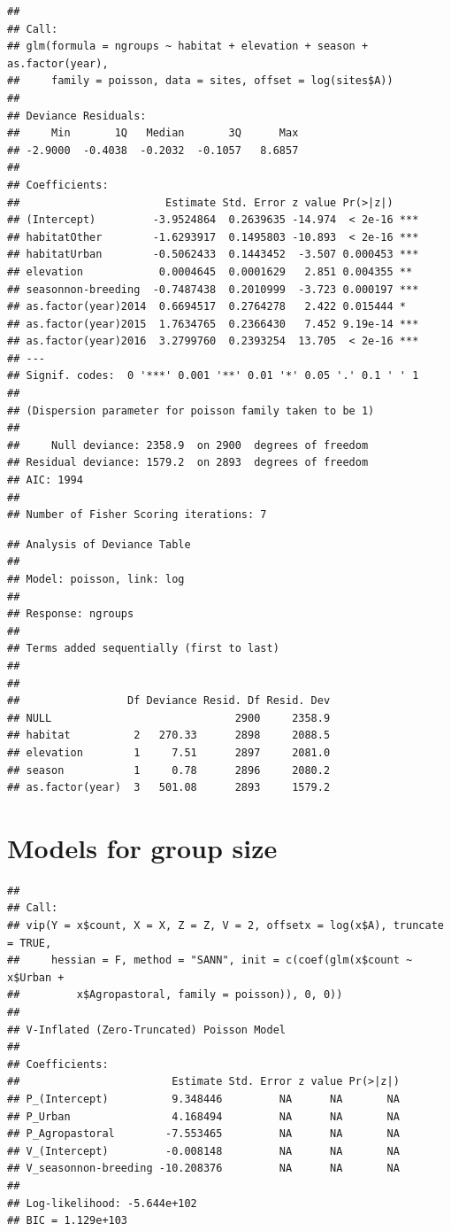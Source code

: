 \documentclass[]{article}
\begin{document}
\begin{verbatim}
## 
## Call:
## glm(formula = ngroups ~ habitat + elevation + season + as.factor(year), 
##     family = poisson, data = sites, offset = log(sites$A))
## 
## Deviance Residuals: 
##     Min       1Q   Median       3Q      Max  
## -2.9000  -0.4038  -0.2032  -0.1057   8.6857  
## 
## Coefficients:
##                       Estimate Std. Error z value Pr(>|z|)    
## (Intercept)         -3.9524864  0.2639635 -14.974  < 2e-16 ***
## habitatOther        -1.6293917  0.1495803 -10.893  < 2e-16 ***
## habitatUrban        -0.5062433  0.1443452  -3.507 0.000453 ***
## elevation            0.0004645  0.0001629   2.851 0.004355 ** 
## seasonnon-breeding  -0.7487438  0.2010999  -3.723 0.000197 ***
## as.factor(year)2014  0.6694517  0.2764278   2.422 0.015444 *  
## as.factor(year)2015  1.7634765  0.2366430   7.452 9.19e-14 ***
## as.factor(year)2016  3.2799760  0.2393254  13.705  < 2e-16 ***
## ---
## Signif. codes:  0 '***' 0.001 '**' 0.01 '*' 0.05 '.' 0.1 ' ' 1
## 
## (Dispersion parameter for poisson family taken to be 1)
## 
##     Null deviance: 2358.9  on 2900  degrees of freedom
## Residual deviance: 1579.2  on 2893  degrees of freedom
## AIC: 1994
## 
## Number of Fisher Scoring iterations: 7
\end{verbatim}

\begin{verbatim}
## Analysis of Deviance Table
## 
## Model: poisson, link: log
## 
## Response: ngroups
## 
## Terms added sequentially (first to last)
## 
## 
##                 Df Deviance Resid. Df Resid. Dev
## NULL                             2900     2358.9
## habitat          2   270.33      2898     2088.5
## elevation        1     7.51      2897     2081.0
## season           1     0.78      2896     2080.2
## as.factor(year)  3   501.08      2893     1579.2
\end{verbatim}

\section{Models for group size}\label{models-for-group-size-1}

\begin{verbatim}
## 
## Call:
## vip(Y = x$count, X = X, Z = Z, V = 2, offsetx = log(x$A), truncate = TRUE, 
##     hessian = F, method = "SANN", init = c(coef(glm(x$count ~ x$Urban + 
##         x$Agropastoral, family = poisson)), 0, 0))
## 
## V-Inflated (Zero-Truncated) Poisson Model
## 
## Coefficients:
##                        Estimate Std. Error z value Pr(>|z|)
## P_(Intercept)          9.348446         NA      NA       NA
## P_Urban                4.168494         NA      NA       NA
## P_Agropastoral        -7.553465         NA      NA       NA
## V_(Intercept)         -0.008148         NA      NA       NA
## V_seasonnon-breeding -10.208376         NA      NA       NA
## 
## Log-likelihood: -5.644e+102 
## BIC = 1.129e+103
\end{verbatim}
\end{document}
